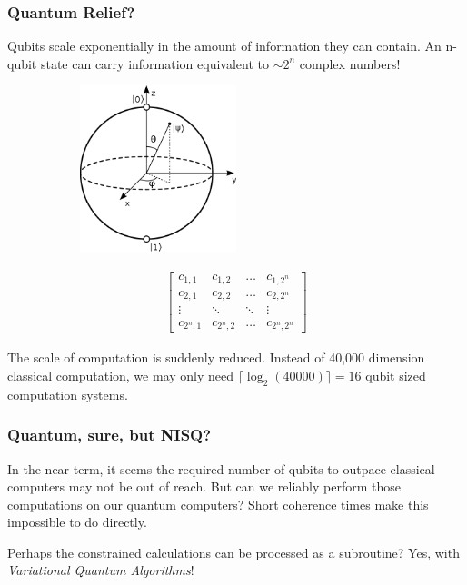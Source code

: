 \begin{frame}
    \frametitle{Quantum Relief?}

    Qubits scale exponentially in the amount of information they can contain. An
    n-qubit state can carry information equivalent to \(\sim 2^n\) complex numbers!

    \begin{figure}
        \centering
        \begin{subfigure}{0.45\textwidth}
            \centering
            \includegraphics[width=0.5\textwidth]{figures/blochsphere.png}
        \end{subfigure}
        \begin{subfigure}{0.45\textwidth}
            \centering
            \begin{gather*}
                \begin{bmatrix}
                    c_{1,1} & c_{1,2} & \ldots & c_{1,2^n} \\
                    c_{2,1} & c_{2,2} & \ldots & c_{2,2^n} \\
                    \vdots & \ddots & \ddots & \vdots \\
                    c_{2^n,1} & c_{2^n,2} & \ldots & c_{2^n,2^n}
                \end{bmatrix}
            \end{gather*}
        \end{subfigure}
    \end{figure}

    The scale of computation is suddenly reduced. Instead of 40,000 dimension
    classical computation, we may only need \(\lceil{\log_2 (40000)}\rceil = 16\)
    qubit sized computation systems.

\end{frame}

\begin{frame}
    \frametitle{Quantum, sure, but NISQ?}

    In the near term, it seems the required number of qubits to outpace
    classical computers may not be out of reach. But can we reliably perform
    those computations on our quantum computers? Short coherence times make this
    impossible to do directly.

    Perhaps the constrained calculations can be processed as a subroutine? Yes,
    with \emph{Variational Quantum Algorithms}!

\end{frame}
